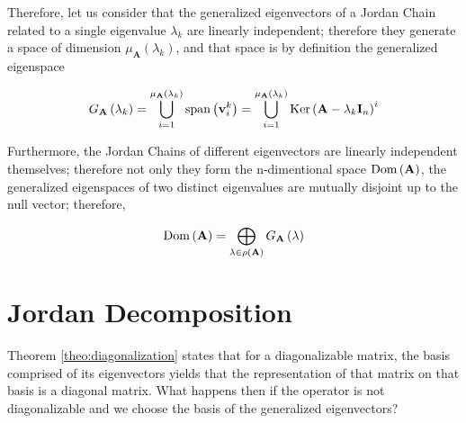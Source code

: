 %
%
%
%
%
%

	Therefore, let us consider that the generalized eigenvectors of a Jordan Chain related to a single eigenvalue $\lambda_k$ are linearly independent; therefore they generate a space of dimension $\mu_\mathbf{A}\left(\lambda_k\right)$, and that space is by definition the generalized eigenspace

\begin{equation} G_{\mathbf{A}} \left(\lambda_k\right) = \bigcup_{i=1}^{\mu_\mathbf{A}\left(\lambda_k\right)} \text{span}\left(\mathbf{v}_i^k\right) =  \bigcup_{i=1}^{\mu_\mathbf{A}\left(\lambda_k\right)} \operatorname{Ker}\left(\mathbf{A} - \lambda_k\mathbf{I}_n\right)^i \end{equation}

	Furthermore, the Jordan Chains of different eigenvectors are linearly independent themselves; therefore not only they form the n-dimentional space $\operatorname{Dom}\left(\mathbf{A}\right)$, the generalized eigenspaces of two distinct eigenvalues are mutually disjoint up to the null vector; therefore, 

\begin{equation} \operatorname{Dom}\left(\mathbf{A}\right) = \bigoplus_{\lambda\in\rho\left(\mathbf{A}\right)} G_{\mathbf{A}} \left(\lambda\right)\end{equation}

\section{Jordan Decomposition} %

	Theorem \ref{theo:diagonalization} states that for a diagonalizable matrix, the basis comprised of its eigenvectors yields that the representation of that matrix on that basis is a diagonal matrix. What happens then if the operator is not diagonalizable and we choose the basis of the generalized eigenvectors?

